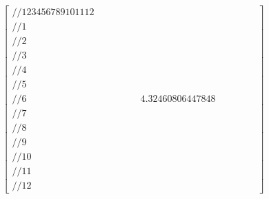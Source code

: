 \documentclass[a4paper,11pt]{book}
\begin{document}
  
  \begin{equation}
 \left[\begin{array}{cccccccccccc}
 //1   2   3   4   5   6   7   8   9   10  11  12 
     &   &   &   &   &   &   &   &   &   &   &   \\ //1
     &   &   &   &   &   &   &   &   &   &   &   \\ //2
     &   &   &   &   &   &   &   &   &   &   &   \\ //3
     &   &   &   &   &   &   &   &   &   &   &   \\ //4
     &   &   &   &   &   &   &   &   &   &   &   \\ //5
     &   &   &   &   &   &   &   &   &   &   &   \\ //6
     &   &   &   &   &   &  4.32460806447848  &   &   &   &   &   \\ //7
     &   &   &   &   &   &   &   &   &   &   &   \\ //8
     &   &   &   &   &   &   &   &   &   &   &   \\ //9
     &   &   &   &   &   &   &   &   &   &   &   \\ //10
     &   &   &   &   &   &   &   &   &   &   &   \\ //11
     &   &   &   &   &   &   &   &   &   &   &   \\ //12   
 \end{array}	\right]
\end{equation}
		
  
  
  
  
  
  
  
  
  
  
  
  
  
  
\end{document}
